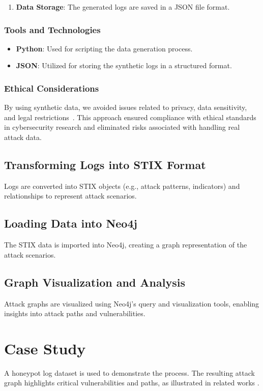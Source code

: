 \documentclass[conference]{IEEEtran}
\begin{document}
\begin{enumerate}
    \item \textbf{Data Storage}: The generated logs are saved in a JSON file format.
\end{enumerate}

\subsubsection{Tools and Technologies}

\begin{itemize}
    \item \textbf{Python}: Used for scripting the data generation process.
    \item \textbf{JSON}: Utilized for storing the synthetic logs in a structured format.
\end{itemize}

\subsubsection{Ethical Considerations}

By using synthetic data, we avoided issues related to privacy, data sensitivity, and legal restrictions~\cite{acm2018ethics}. This approach ensured compliance with ethical standards in cybersecurity research and eliminated risks associated with handling real attack data.




\subsection{Transforming Logs into STIX Format}
Logs are converted into STIX objects (e.g., attack patterns, indicators) and relationships to represent attack scenarios.

\subsection{Loading Data into Neo4j}
The STIX data is imported into Neo4j, creating a graph representation of the attack scenarios.

\subsection{Graph Visualization and Analysis}
Attack graphs are visualized using Neo4j's query and visualization tools, enabling insights into attack paths and vulnerabilities.

\section{Case Study}
A honeypot log dataset is used to demonstrate the process. The resulting attack graph highlights critical vulnerabilities and paths, as illustrated in related works \cite{banati2022attackgraphs}.
\end{document}
